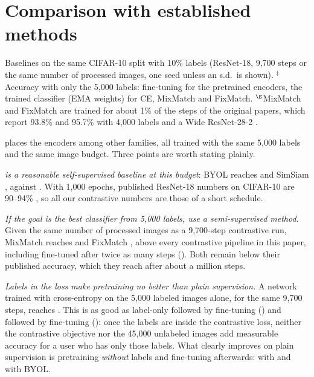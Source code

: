 
\section{Comparison with established methods}
\label{sec:baselines}

\begin{table}[t]
\centering
\small
\caption{Baselines on the same CIFAR-10 split with 10\% labels (ResNet-18, 9,700 steps or the same number of
processed images, one seed unless an s.d.\ is shown). $^\ddagger$Accuracy with only the 5,000 labels:
fine-tuning for the pretrained encoders, the trained classifier (EMA weights) for CE, MixMatch and FixMatch.
$^\S$MixMatch and FixMatch are trained for about 1\% of the steps of the original papers, which report 93.8\%
and 95.7\% with 4,000 labels and a Wide ResNet-28-2 \citep{sohn2020fixmatch}.}
\label{tab:baselines}
\begin{adjustbox}{max width=\linewidth}

\end{adjustbox}
\end{table}

 places the encoders among other families, all trained with the same 5,000 labels and the
same image budget. Three points are worth stating plainly.

\emph{\simclr is a reasonable self-supervised baseline at this budget}: BYOL reaches \byolLin and SimSiam
\simsiamLin, against \simclrLin. With 1,000 epochs, published ResNet-18 numbers on CIFAR-10 are 90--94\%
\citep{dacosta2022sololearn}, so all our contrastive numbers are those of a short schedule.

\emph{If the goal is the best classifier from 5,000 labels, use a semi-supervised method.} Given the same
number of processed images as a 9,700-step contrastive run, MixMatch reaches \mixmatchAcc and FixMatch
\fixmatchAcc, above every contrastive pipeline in this paper, including \simclr fine-tuned after twice as many
steps (\simclrTwoHundredFt). Both remain below their published accuracy, which they reach after about a
million steps.

\emph{Labels in the loss make pretraining no better than plain supervision.} A network trained with
cross-entropy on the 5,000 labeled images alone, for the same 9,700 steps, reaches \ceTen. This is as good as
label-only \supcon followed by fine-tuning (\supconFt) and \union followed by fine-tuning (\unionFt): once the
labels are inside the contrastive loss, neither the contrastive objective nor the 45,000 unlabeled images add
measurable accuracy for a user who has only those labels. What clearly improves on plain supervision is
pretraining \emph{without} labels and fine-tuning afterwards: \simclrFt with \simclr and \byolFt with BYOL.

